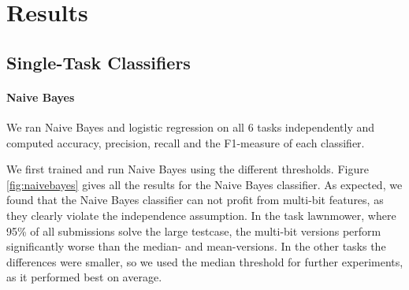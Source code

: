 \section{Results}
\subsection{Single-Task Classifiers}
\paragraph*{Naive Bayes}
We ran Naive Bayes and logistic regression on all 6 tasks independently and computed accuracy, precision, recall and the F1-measure of each classifier. 

We first trained and run Naive Bayes using the different thresholds. Figure \ref{fig:naivebayes} gives all the results for the Naive Bayes classifier. As expected, we found that the Naive Bayes classifier can not profit from multi-bit features, as they clearly violate the independence assumption. In the task lawnmower, where 95\% of all submissions solve the large testcase, the multi-bit versions perform significantly worse than the median- and mean-versions. In the other tasks the differences were smaller, so we used the median threshold for further experiments, as it performed best on average.

